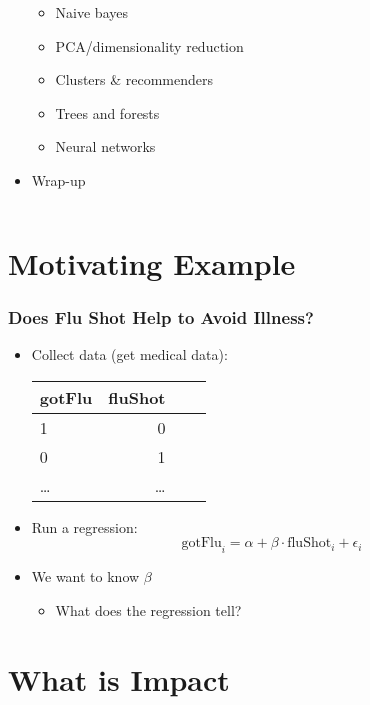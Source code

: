 \documentclass[mathserif, xcolor=table, svgnames]{beamer}
\begin{document}
\begin{frame}
\begin{columns}
\begin{column}{0.5\linewidth}
\begin{itemize}
      \begin{itemize}
      \item Naive bayes
      \item PCA/dimensionality reduction
      \item Clusters \& recommenders
      \item Trees and forests
      \item Neural networks
      \end{itemize}
    \item Wrap-up
    \end{itemize}
  \end{column}
\end{columns}
\end{frame}

\section[Example]{Motivating Example}
\frame{\tableofcontents[currentsection]}

\begin{frame}
  \frametitle{Does Flu Shot Help to Avoid Illness?}
  \begin{itemize}
  \item Collect data (get medical data):
    \begin{center}
      \begin{tabular}{lrrr}
        \toprule
        gotFlu & fluShot \\
        \midrule
        1 & 0 \\
        0 & 1 \\
        \dots & \dots\\
        \bottomrule
      \end{tabular}
    \end{center}
  \item Run a regression:
    \begin{equation*}
      \text{gotFlu}_{i} = \alpha + \beta \cdot \text{fluShot}_{i} + \epsilon_{i}
    \end{equation*}
  \item We want to know $\beta$
    \begin{itemize}
    \item What does the regression tell?
    \end{itemize}
  \end{itemize}
\end{frame}

\section[Impact]{What is Impact}
\frame{\tableofcontents[currentsection]}
\end{document}
